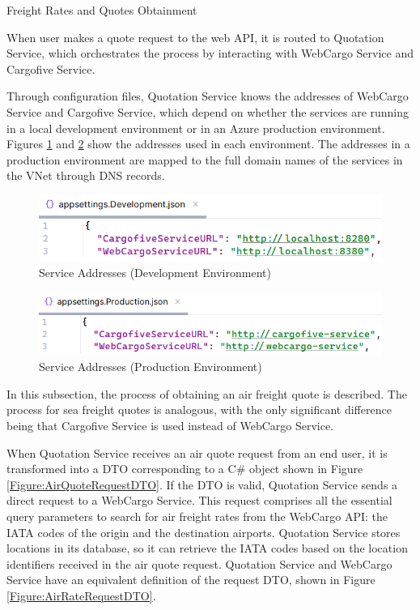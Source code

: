 \documentclass[12pt, reqno, oneside]{amsbook}
\makeatletter
\def\subsection{\@startsection{subsection}{2}%
      \z@{.5\linespacing\@plus.7\linespacing}{.25\linespacing}%
      {\normalfont\bfseries\flushleft}}
\theoremstyle{definition}
\theoremstyle{definition}
\numberwithin{section}{chapter}
\numberwithin{table}{chapter}
\numberwithin{figure}{chapter}
\makeatother
\begin{document}
\pagebreak

\subsection{Freight Rates and Quotes Obtainment}
\label{Subsection:Freight_Rates_And_Quotes_Obtainment}

When user makes a quote request to the web \ac{API}, it is routed to Quotation Service, which orchestrates the process by interacting with WebCargo Service and Cargofive Service.

Through configuration files, Quotation Service knows the addresses of WebCargo Service and Cargofive Service, which depend on whether the services are running in a local development environment or in an Azure production environment. Figures \ref{Figure:ServiceAddressesDevelopment} and \ref{Figure:ServiceAddressesProduction} show the addresses used in each environment. The addresses in a production environment are mapped to the full domain names of the services in the \ac{VNet} through \ac{DNS} records.

\begin{figure}[H]
  \centering
  \includegraphics[width=0.8\linewidth]{images/ServiceAddressesDevelopment.png}
  \caption{\label{Figure:ServiceAddressesDevelopment}Service Addresses (Development Environment)}
\end{figure}

\begin{figure}[H]
  \centering
  \includegraphics[width=0.8\linewidth]{images/ServiceAddressesProduction.png}
  \caption{\label{Figure:ServiceAddressesProduction}Service Addresses (Production Environment)}
\end{figure}

In this subsection, the process of obtaining an air freight quote is described. The process for sea freight quotes is analogous, with the only significant difference being that Cargofive Service is used instead of WebCargo Service.

When Quotation Service receives an air quote request from an end user, it is transformed into a \ac{DTO} corresponding to a C\# object shown in Figure \ref{Figure:AirQuoteRequestDTO}. If the \ac{DTO} is valid, Quotation Service sends a direct request to a WebCargo Service. This request comprises all the essential query parameters to search for air freight rates from the WebCargo \ac{API}: the \ac{IATA} codes of the origin and the destination airports. Quotation Service stores locations in its database, so it can retrieve the \ac{IATA} codes based on the location identifiers received in the air quote request. Quotation Service and WebCargo Service have an equivalent definition of the request \ac{DTO}, shown in Figure \ref{Figure:AirRateRequestDTO}.
\end{document}
